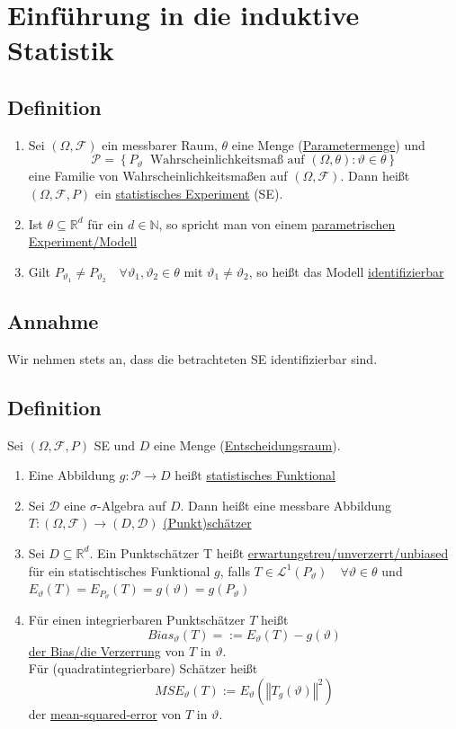 \documentclass[german,10pt,oneside, fleqn, a4paper]{article}
\newcommand {\R}	{\mathbb{R}}
\newcommand {\N}	{\mathbb{N}}
\newcommand{\ra}{\rightarrow}
\newcommand{\brc}[1]{\left(#1\right)}
\newcommand{\brac}[1]{\left\lbrace #1\right\rbrace}
\newcommand{\norm}[1]{\left\Vert #1 \right\Vert}
\newcommand{\mc}[1]{\mathcal{#1}}
\newcommand{\lp}[1]{\mc{L}^{#1}}
\newcommand{\1}[1]{1_{#1}}
\newcommand{\2}[1]{\1{\brac{#1}}}
\newcommand{\raum}{\brc{\Omega,\mc{F},P}}
\newcommand{\f}{\mc{F}}
\newcommand{\p}{\mc{P}}
\newcommand{\qf}{\quad\forall}
\begin{document}
\section{Einführung in die induktive Statistik}
\subsection{Definition}
\label{9.1}
\begin{enumerate}[label=(\roman*)]
\item Sei $(\Omega,\f)$ ein messbarer Raum, $\theta$ eine Menge (\underline{Parametermenge}) und \[\p=\brac{P_\vartheta\ \text{ Wahrscheinlichkeitsmaß auf }(\Omega,\theta):\vartheta\in\theta}\]
eine Familie von Wahrscheinlichkeitsmaßen auf $(\Omega,\f)$. Dann heißt $\raum$ ein \underline{statistisches Experiment} (SE).
\item Ist $\theta\subseteq\R^d$ für ein $d\in\N$, so spricht man von einem \underline{parametrischen Experiment/Modell}
\item Gilt $P_{\vartheta_1}\neq P_{\vartheta_2}\qf \vartheta_1,\vartheta_2\in\theta$ mit $\vartheta_1\neq\vartheta_2$, so heißt das Modell \underline{identifizierbar}
\end{enumerate}

\subsection{Annahme}
\label{9.2}
Wir nehmen stets an, dass die betrachteten SE identifizierbar sind.

\subsection{Definition}
\label{9.3}
Sei $\raum$ SE und $D$ eine Menge (\underline{Entscheidungsraum}).\begin{enumerate}[label=(\alph*)]
\item Eine Abbildung $g:\p\ra D$ heißt \underline{statistisches Funktional}
\item Sei $\mc{D}$ eine $\sigma$-Algebra auf $D$. Dann heißt eine messbare Abbildung $T:(\Omega,\f)\ra(D,\mc{D})$ \underline{(Punkt)schätzer}
\item Sei $D\subseteq\R^d$. Ein Punktschätzer T heißt \underline{erwartungstreu/unverzerrt/unbiased} für ein statischtisches Funktional $g$, falls $T\in\lp{1}(P_\vartheta)\qf \vartheta\in\theta$ und $E_\vartheta(T)=E_{P_\vartheta}(T)=g(\vartheta)=g(P_\vartheta)$
\item Für einen integrierbaren Punktschätzer $T$ heißt \[
Bias_\vartheta(T)=:=E_\vartheta(T)-g(\vartheta)\]
\underline{der Bias/die Verzerrung} von $T$ in $\vartheta$.\\
Für (quadratintegrierbare) Schätzer heißt \[
MSE_\vartheta(T):=E_\vartheta(\norm{T_g(\vartheta)}^2)\]
der \underline{mean-squared-error} von $T$ in $\vartheta$.
\end{enumerate}
\end{document}
